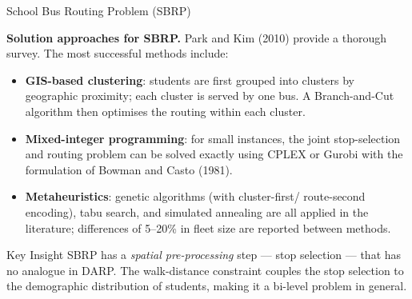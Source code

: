 \documentclass[aspectratio=169,10pt]{beamer}
\begin{document}
\begin{frame}[allowframebreaks]{School Bus Routing Problem (SBRP)}
  \framebreak

  \textbf{Solution approaches for SBRP.}  Park and Kim (2010) provide a
  thorough survey.  The most successful methods include:
  \begin{itemize}
    \item \textbf{GIS-based clustering}: students are first grouped into
          clusters by geographic proximity; each cluster is served by one bus.
          A Branch-and-Cut algorithm then optimises the routing within each
          cluster.
    \item \textbf{Mixed-integer programming}: for small instances, the joint
          stop-selection and routing problem can be solved exactly using CPLEX
          or Gurobi with the formulation of Bowman and Casto (1981).
    \item \textbf{Metaheuristics}: genetic algorithms (with cluster-first/
          route-second encoding), tabu search, and simulated annealing are all
          applied in the literature; differences of 5--20\% in fleet size are
          reported between methods.
  \end{itemize}

  \begin{alertblock}{Key Insight}
    SBRP has a \emph{spatial pre-processing} step — stop selection — that has
    no analogue in DARP.  The walk-distance constraint couples the stop
    selection to the demographic distribution of students, making it a
    bi-level problem in general.
  \end{alertblock}

\end{frame}
\end{document}
